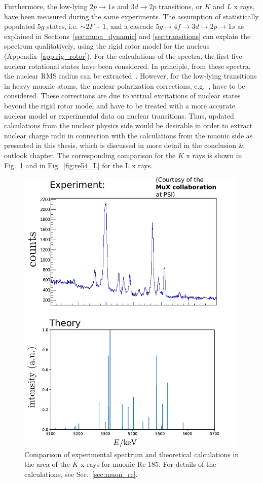 Furthermore, the low-lying $2p\rightarrow1s$ and $3d\rightarrow 2p$ transitions, or $K$ and $L$ x rays, have been measured during the same experiments. The assumption of statistically populated $5g$ states, i.e. $\sim 2F+1$, and a cascade $5g\rightarrow 4f \rightarrow 3d \rightarrow 2p \rightarrow 1s$ as explained in Sections~\ref{sec:muon_dynamic} and \ref{sec:transitions} can explain the spectrum qualitatively, using the rigid rotor model for the nucleus (Appendix~\ref{app:rig_rotor}). For the calculations of the spectra, the first five nuclear rotational states have been considered. In principle, from these spectra, the nuclear RMS radius can be extracted~\cite{hitlin1970}. However, for the low-lying transitions in heavy muonic atoms, the nuclear polarization corrections, e.g.~\cite{chen1970}, have to be considered. These corrections are due to virtual excitations of nuclear states beyond the rigid rotor model and have to be treated with a more accurate nuclear model or experimental data on nuclear transitions. Thus, updated calculations from the nuclear physics side would be desirable in order to extract nuclear charge radii in connection with the calculations from the muonic side as presented in this thesis, which is discussed in more detail in the conclusion \& outlook chapter.
The corresponding comparison for the $K$ x rays is shown in Fig.~\ref{fig:re54_K} and in Fig.~\ref{fig:re54_L} for the L x rays.
\begin{figure}%
\centering
\includegraphics[width=0.99\textwidth]{pics/185Re_K}
\caption{
Comparison of experimental spectrum and theoretical calculations in the area of the $K$ x rays for muonic Re-185. For details of the calculations, see Sec.~\ref{sec:muon_re}.
}
\label{fig:re54_K}
\end{figure}

